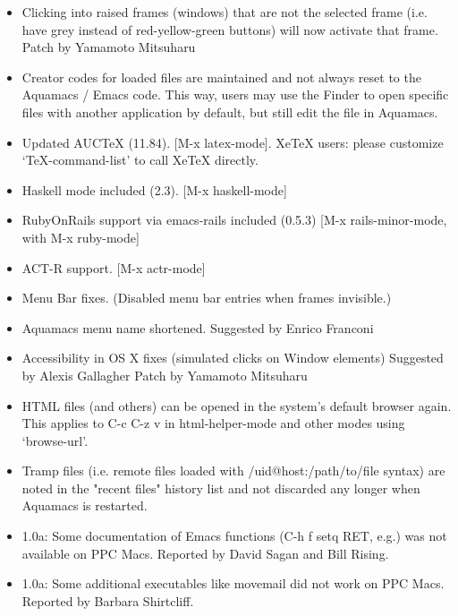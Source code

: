 \begin{itemize}
\item Clicking into raised frames (windows) that are not the selected
        frame (i.e. have grey instead of red-yellow-green buttons) will
        now activate that frame.
        Patch by Yamamoto Mitsuharu

\item Creator codes for loaded files are maintained and not always
        reset to the Aquamacs / Emacs code. This way, users may use the
        Finder to open specific files with another application by default,
        but still edit the file in Aquamacs.

\item Updated AUCTeX (11.84). [M-x latex-mode].
        XeTeX users: please customize `TeX-command-list' to call XeTeX
        directly.

\item Haskell mode included (2.3). [M-x haskell-mode]

\item RubyOnRails support via emacs-rails included (0.5.3)
                                        [M-x rails-minor-mode, with M-x ruby-mode]

\item ACT-R support. [M-x actr-mode]

\item Menu Bar fixes. (Disabled menu bar entries when frames invisible.)

\item Aquamacs menu name shortened.
        Suggested by Enrico Franconi

\item Accessibility in OS X fixes (simulated clicks on Window elements)
        Suggested by Alexis Gallagher
        Patch by Yamamoto Mitsuharu

\item HTML files (and others) can be opened in the system's default
        browser again. This applies to C-c C-z v in html-helper-mode and
        other modes using `browse-url'.

\item  Tramp files (i.e. remote files loaded with
        /uid@host:/path/to/file syntax) are noted in the "recent files"
        history list and not discarded any longer when Aquamacs is
        restarted.

\item 1.0a: Some documentation of Emacs functions (C-h f setq RET, e.g.) was not available on PPC Macs.
  Reported by David Sagan and Bill Rising.
\item 1.0a: Some additional executables like movemail did not work on PPC Macs.
Reported by Barbara Shirtcliff.


\end{itemize}
